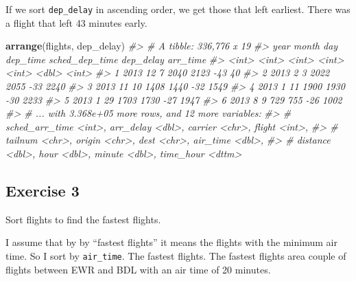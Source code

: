\documentclass[]{book}
\newenvironment{Shaded}{\begin{snugshade}}{\end{snugshade}}
\newcommand{\CommentTok}[1]{\textcolor[rgb]{0.56,0.35,0.01}{\textit{#1}}}
\newcommand{\KeywordTok}[1]{\textcolor[rgb]{0.13,0.29,0.53}{\textbf{#1}}}
\newcommand{\NormalTok}[1]{#1}
\theoremstyle{plain}
\theoremstyle{remark}
\theoremstyle{definition}
\theoremstyle{definition}
\theoremstyle{definition}
\theoremstyle{remark}
\begin{document}
If we sort \texttt{dep\_delay} in ascending order, we get those that
left earliest. There was a flight that left 43 minutes early.

\begin{Shaded}
\begin{Highlighting}[]
\KeywordTok{arrange}\NormalTok{(flights, dep_delay)}
\CommentTok{#> # A tibble: 336,776 x 19}
\CommentTok{#>    year month   day dep_time sched_dep_time dep_delay arr_time}
\CommentTok{#>   <int> <int> <int>    <int>          <int>     <dbl>    <int>}
\CommentTok{#> 1  2013    12     7     2040           2123       -43       40}
\CommentTok{#> 2  2013     2     3     2022           2055       -33     2240}
\CommentTok{#> 3  2013    11    10     1408           1440       -32     1549}
\CommentTok{#> 4  2013     1    11     1900           1930       -30     2233}
\CommentTok{#> 5  2013     1    29     1703           1730       -27     1947}
\CommentTok{#> 6  2013     8     9      729            755       -26     1002}
\CommentTok{#> # ... with 3.368e+05 more rows, and 12 more variables:}
\CommentTok{#> #   sched_arr_time <int>, arr_delay <dbl>, carrier <chr>, flight <int>,}
\CommentTok{#> #   tailnum <chr>, origin <chr>, dest <chr>, air_time <dbl>,}
\CommentTok{#> #   distance <dbl>, hour <dbl>, minute <dbl>, time_hour <dttm>}
\end{Highlighting}
\end{Shaded}

\hypertarget{exercise-3-6}{%
\subsection{Exercise 3}\label{exercise-3-6}}

Sort flights to find the fastest flights.

I assume that by by ``fastest flights'' it means the flights with the
minimum air time. So I sort by \texttt{air\_time}. The fastest flights.
The fastest flights area couple of flights between EWR and BDL with an
air time of 20 minutes.
\end{document}
